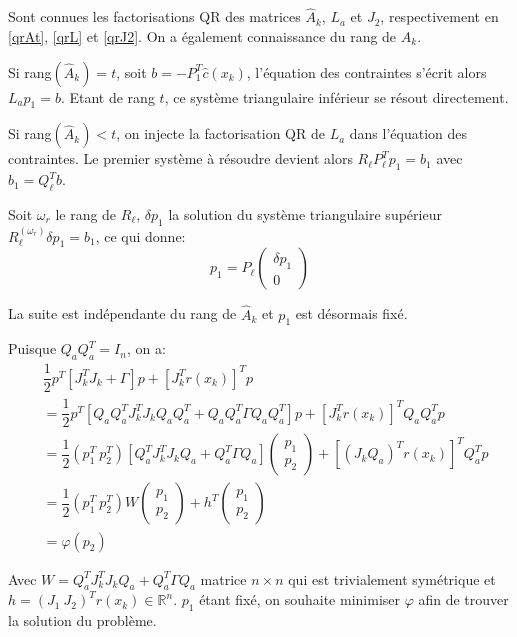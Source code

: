\documentclass[a4paper,11pt]{article}
\newcommand{\ha}{\hat{A}}
\newcommand{\hc}{\hat{c}}
\numberwithin{equation}{section}
\begin{document}
Sont connues les factorisations QR des matrices $\ha_{k}$, $L_{a}$ et $J_{2}$, respectivement en \eqref{qrAt}, \eqref{qrL} et \eqref{qrJ2}. On a également connaissance du rang de $\ha_{k}$.

Si rang$(\ha_{k})=t$, soit $b = -P_1^T\hc(x_{k})$, l'équation des contraintes s'écrit alors \\ $L_{a}p_1 = b$. Etant de rang $t$, ce système triangulaire inférieur se résout directement.

Si rang$(\ha_{k})<t$, on injecte la factorisation QR de $L_{a}$ dans l'équation des contraintes. Le premier système à résoudre devient alors $R_{\ell}P_{\ell}^Tp_1 = b_1$ avec $b_{1}=Q_{\ell}^{T}b$. 

Soit $\omega_{r}$ le rang de $R_{\ell}$, $\delta p_{1}$ la solution du système triangulaire supérieur $R_{\ell}^{(\omega_{r})}\delta p_{1} = b_{1}$, ce qui donne:
$$ p_{1} = P_{\ell} \begin{pmatrix} \delta p_{1} \\ 0 \end{pmatrix}$$

La suite est indépendante du rang de $\ha_{k}$ et $p_{1}$ est désormais fixé.

Puisque $Q_{a}Q_{a}^T = I_n$, on a:
\begin{align*}
&\dfrac{1}{2}p^T\left[J_{k}^TJ_{k} + \Gamma\right]p + \left[J_{k}^Tr(x_{k})\right]^Tp \\
&= \dfrac{1}{2}p^T\left[Q_{a}Q_{a}^TJ_{k}^TJ_{k}Q_{a}Q_{a}^T + Q_{a}Q_{a}^T\Gamma Q_{a}Q_{a}^T\right]p + \left[J_{k}^Tr(x_{k})\right]^TQ_{a}Q_{a}^Tp \\
&= \dfrac{1}{2}(p_1^T\ p_2^T) \left[Q_{a}^TJ_{k}^TJ_{k}Q_{a} + Q_{a}^T\Gamma Q_{a}\right]\begin{pmatrix} p_1 \\ p_2\end{pmatrix} + \left[(J_{k}Q_{a})^Tr(x_{k})\right]^TQ_{a}^{T}p\\
&= \dfrac{1}{2}(p_1^T\ p_2^T)W\begin{pmatrix}p_1\\p_2\end{pmatrix} + h^T\begin{pmatrix}p_1\\p_2\end{pmatrix} \\
&= \varphi(p_2)
\end{align*}

Avec $W = Q_{a}^TJ_{k}^TJ_{k}Q_{a} + Q_{a}^T\Gamma Q_{a}$ matrice $n\times n$ qui est trivialement symétrique et $h = (J_1\ J_2)^Tr(x_{k}) \in \mathbb{R}^n$. $p_1$ étant fixé, on souhaite minimiser $\varphi$ afin de trouver la solution du problème.
\end{document}
